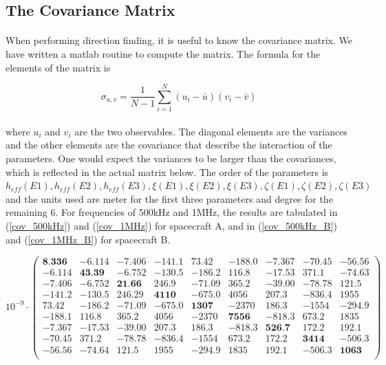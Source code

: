 \documentclass[a4paper,10pt]{thesis}
\begin{document}
\subsection{The Covariance Matrix}
\paragraph*{}
When performing direction finding, it is useful to know the covariance matrix. We have written a matlab routine to compute the matrix. The formula for the elements of the matrix is

\begin{equation}\label{covariance}
    \sigma_{u,v}=\frac{1}{N-1}\sum_{i=1}^N(u_i-\bar{u})(v_i-\bar{v})
\end{equation}

\paragraph*{}
where $u_i$ and $v_i$ are the two observables. The diagonal elements are the variances and the other elements are the covariance that describe the interaction of the parameters. One would expect the variances to be larger than the covariances, which is reflected in the actual matrix below. The order of the parameters is\\
 $h_{eff}(E1), h_{eff}(E2), h_{eff}(E3), \xi(E1), \xi(E2),\xi(E3),\zeta(E1), \zeta(E2), \zeta(E3)$ and the units used are meter for the first three parameters and degree for the remaining 6. For frequencies of 500kHz and 1MHz, the results are tabulated in (\ref{cov_500kHz}) and (\ref{cov_1MHz}) for spacecraft A, and in (\ref{cov_500kHz_B}) and (\ref{cov_1MHz_B}) for spacecraft B.

\tiny
\begin{equation}\label{cov_500kHz}
10^{-9}\cdot \left(
\begin{array}{ccccccccc}
  \textbf{8.336} & -6.114 & -7.406 & -141.1 & 73.42 & -188.0 & -7.367 & -70.45 & -56.56 \\
-6.114 & \textbf{43.39} & -6.752 & -130.5 & -186.2 & 116.8 & -17.53 & 371.1 & -74.63 \\
-7.406 & -6.752 & \textbf{21.66} & 246.9 & -71.09 & 365.2 & -39.00 & -78.78 & 121.5 \\
 -141.2 & -130.5 & 246.29 & \textbf{4110} & -675.0 & 4056 & 207.3 & -836.4 & 1955 \\
 73.42 & -186.2 & -71.09 & -675.0 & \textbf{1307} & -2370 & 186.3 & -1554 & -294.9 \\
 -188.1 & 116.8 & 365.2 & 4056 & -2370 & \textbf{7556} & -818.3 & 673.2 & 1835 \\
 -7.367 & -17.53 & -39.00 & 207.3 & 186.3 & -818.3 & \textbf{526.7} & 172.2 & 192.1 \\
 -70.45 & 371.2 & -78.78 & -836.4 & -1554 & 673.2 & 172.2 & \textbf{3414} & -506.3 \\
 -56.56 & -74.64 & 121.5 & 1955 & -294.9 & 1835 & 192.1 & -506.3 & \textbf{1063} \\
\end{array}%
\right)
\end{equation}
\normalsize
\end{document}
